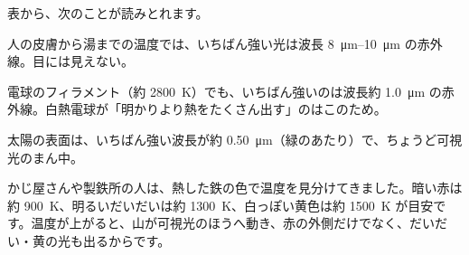 表から、次のことが読みとれます。
\begin{enumerate}[label={\bkcircled[bkBlue]{\arabic*}}, leftmargin=2.4\zw, itemsep=1pt, topsep=2pt]
\item 人の皮膚から湯までの温度では、いちばん強い光は波長 \qtyrange{8}{10}{\micro m} の赤外線。目には見えない。
\item 電球のフィラメント（約 \qty{2800}{K}）でも、いちばん強いのは波長約 \qty{1.0}{\micro m} の赤外線。白熱電球が「明かりより熱をたくさん出す」のはこのため。
\item 太陽の表面は、いちばん強い波長が約 \qty{0.50}{\micro m}（緑のあたり）で、ちょうど可視光のまん中。
\end{enumerate}

\begin{phmijika}[鉄の色で温度を読む]
かじ屋さんや製鉄所の人は、熱した鉄の色で温度を見分けてきました。暗い赤は約 \qty{900}{K}、明るいだいだいは約 \qty{1300}{K}、白っぽい黄色は約 \qty{1500}{K} が目安です。温度が上がると、山が可視光のほうへ動き、赤の外側だけでなく、だいだい・黄の光も出るからです。
\end{phmijika}

